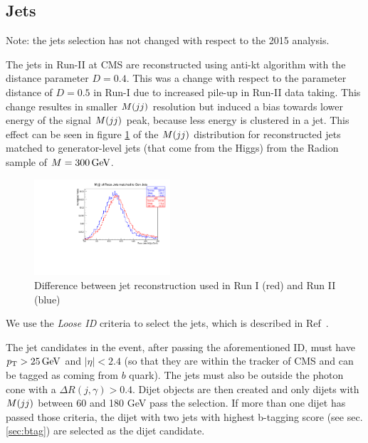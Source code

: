 \subsection{Jets}
\label{sec:jets}

Note: the jets selection has not changed with respect to the 2015 analysis. 

The jets in Run-II at CMS are reconstructed using anti-kt algorithm
with the distance parameter $D=0.4$. This was a change with respect to
the parameter distance of $D=0.5$ in Run-I due to increased pile-up in
Run-II data taking. This change resultes in smaller $M(jj)$ resolution
but induced a bias towards lower energy of the signal $M(jj)$ peak,
because less energy is clustered in a jet. This effect can be seen in
figure \ref{fig:jet-reco} of the $M(jj)$ distribution for reconstructed
jets matched to generator-level jets (that come from the Higgs) from
the Radion sample of $M=300\,\text{Ge\hspace{-.08em}V}$.

\begin{figure}[thb]
  \centering
  \includegraphics[width=0.45\textwidth]{figures/sec-jets/jet_rec.pdf}\hfil
  \caption{Difference between jet reconstruction used in Run I (red) and Run II (blue)}
  \label{fig:jet-reco}
\end{figure}

We use the \textit{Loose ID} criteria to select the jets, which is described in
Ref~\cite{jetID-twiki}.

The jet candidates in the event, after passing the aforementioned ID,
must have $p_{\mathrm{T}} > 25 \,\text{Ge\hspace{-.08em}V}$ and $|\eta| < 2.4$ (so that they are within
the tracker of CMS and can be tagged as coming from $b$ quark). The
jets must also be outside the photon cone with a $\Delta R(j,\gamma) >
0.4$. Dijet objects are then created and only dijets with $M(jj)$ between 60 and 180 GeV 
pass the selection. If more than one dijet has passed those criteria, the dijet with two jets
with highest b-tagging score (see sec. \ref{sec:btag}) are selected as
the dijet candidate.


